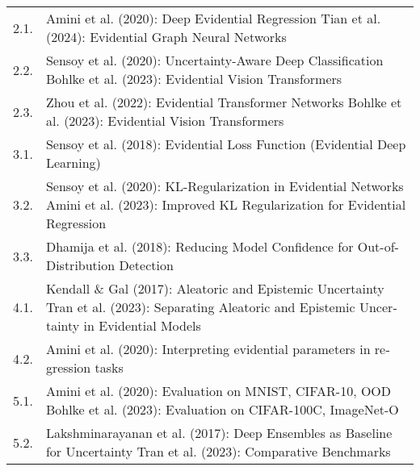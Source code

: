 \begin{otherlanguage}{ngerman}
\begin{table}[htbp]
\begin{tabularx}{\textwidth}{|l|X|}
2.1. & Amini et al. (2020): Deep Evidential Regression \cite{amini2020deep} \newline
         Tian et al. (2024): Evidential Graph Neural Networks \cite{tian2024egnn} \\ 
2.2. & Sensoy et al. (2020): Uncertainty-Aware Deep Classification \cite{sensoy2020uncertainty} \newline
         Bohlke et al. (2023): Evidential Vision Transformers \cite{bohlke2023evidentialvit} \\ 
2.3. & Zhou et al. (2022): Evidential Transformer Networks \cite{zhou2022evidential} \newline
         Bohlke et al. (2023): Evidential Vision Transformers \cite{bohlke2023evidentialvit} \\ \hline

3.1. & Sensoy et al. (2018): Evidential Loss Function (Evidential Deep Learning) \cite{sensoy2018evidential} \\ 
3.2. & Sensoy et al. (2020): KL-Regularization in Evidential Networks \cite{sensoy2020uncertainty} \newline
         Amini et al. (2023): Improved KL Regularization for Evidential Regression \cite{amini2023kl} \\ 
3.3. & Dhamija et al. (2018): Reducing Model Confidence for Out-of-Distribution Detection \cite{dhamija2018reducing} \\ \hline

4.1. & Kendall \& Gal (2017): Aleatoric and Epistemic Uncertainty \cite{kendall2017uncertainties} \newline
         Tran et al. (2023): Separating Aleatoric and Epistemic Uncertainty in Evidential Models \cite{tran2023separating} \\ 
4.2. & Amini et al. (2020): Interpreting evidential parameters in regression tasks \cite{amini2020deep} \\ \hline

5.1. & Amini et al. (2020): Evaluation on MNIST, CIFAR-10, OOD \cite{amini2020deep} \newline
         Bohlke et al. (2023): Evaluation on CIFAR-100C, ImageNet-O \cite{bohlke2023evidentialvit} \\ 
5.2. & Lakshminarayanan et al. (2017): Deep Ensembles as Baseline for Uncertainty \cite{lakshminarayanan2017simple} \newline
         Tran et al. (2023): Comparative Benchmarks \cite{tran2023separating} \\ \hline


\end{tabularx}
\end{table}
\end{otherlanguage}
